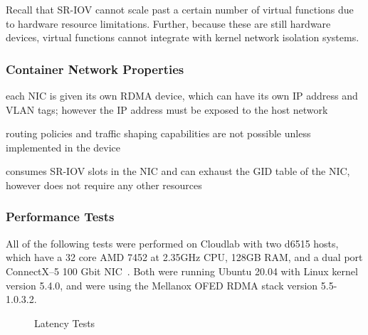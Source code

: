 \documentclass[12pt,titlepage]{article}
\begin{document}
Recall that SR-IOV cannot scale past a certain number of virtual functions due to hardware resource limitations.
Further, because these are still hardware devices, virtual functions cannot integrate with kernel network isolation systems.

\subsubsection*{Container Network Properties}
\begin{description}[nolistsep,font={{\scshape\bfseries}}]
	\item[Network Isolation] each NIC is given its own RDMA device, which can have its own IP address and VLAN tags; however the IP address must be exposed to the host network
	\item[Controllability] routing policies and traffic shaping capabilities are not possible unless implemented in the device
	\item[Resource Utilization] consumes SR-IOV slots in the NIC and can exhaust the GID table of the NIC, however does not require any other resources
\end{description}

\subsubsection*{Performance Tests}
All of the following tests were performed on Cloudlab with two d6515 hosts, which have a 32 core AMD 7452 at 2.35GHz CPU, 128GB RAM, and a dual port ConnectX--5 100 Gbit NIC~\cite{cloudlab}. 
Both were running Ubuntu 20.04 with Linux kernel version 5.4.0, and were using the Mellanox OFED RDMA stack version 5.5-1.0.3.2.

\begin{figure}
	\centering
	\caption{Latency Tests}%
	\label{fig:sriov_latency}
\end{figure}
\end{document}
